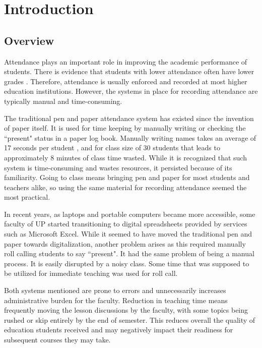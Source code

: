 \chapter{Introduction}
\label{sec:researchdesc}    %

\section{Overview}
\label{sec:overview}

Attendance plays an important role in improving the academic performance of students. There is evidence that students with lower attendance often have lower grades \cite{EJES3887}. Therefore, attendance is usually enforced and recorded at most higher education institutions. However, the systems in place for recording attendance are typically manual and time-consuming.

The traditional pen and paper attendance system has existed since the invention of paper itself. It is used for time keeping by manually writing or checking the ``present" status in a paper log book. Manually writing names takes an average of 17 seconds per student \cite{shoewu:2014}, and for class size of 30 students that leads to approximately 8 minutes of class time wasted. While it is recognized that such system is time-consuming and wastes resources, it persisted because of its familiarity. Going to class means bringing pen and paper for most students and teachers alike, so using the same material for recording attendance seemed the most practical.

In recent years, as laptops and portable computers became more accessible, some faculty of UP started transitioning to digital spreadsheets provided by services such as Microsoft Excel. While it seemed to have moved the traditional pen and paper towards digitalization, another problem arises as this required manually roll calling students to say ``present". It had the same problem of being a manual process. It is easily disrupted by a noisy class. Some time that was supposed to be utilized for immediate teaching was used for roll call.

Both systems mentioned are prone to errors and unnecessarily increases administrative burden for the faculty. Reduction in teaching time means frequently moving the lesson discussions by the faculty, with some topics being rushed or skip entirely by the end of semester. This reduces overall the quality of education students received and may negatively impact their readiness for subsequent courses they may take. 


